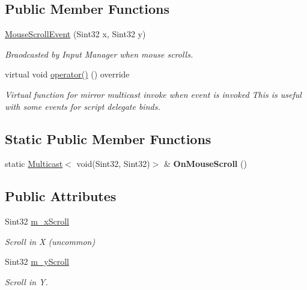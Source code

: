 \subsection*{Public Member Functions}
\begin{DoxyCompactItemize}
\item 
\hyperlink{classMouseScrollEvent_a3938241efa68cba150c7c9957b447258}{Mouse\+Scroll\+Event} (Sint32 x, Sint32 y)
\begin{DoxyCompactList}\small\item\em Braodcasted by Input Manager when mouse scrolls. \end{DoxyCompactList}\item 
\mbox{\label{classMouseScrollEvent_a4b4ffccb70bf75327aa323f6c1fd7d20}} 
virtual void \hyperlink{classMouseScrollEvent_a4b4ffccb70bf75327aa323f6c1fd7d20}{operator()} () override
\begin{DoxyCompactList}\small\item\em Virtual function for mirror multicast invoke when event is invoked This is useful with some events for script delegate binds. \end{DoxyCompactList}\end{DoxyCompactItemize}
\subsection*{Static Public Member Functions}
\begin{DoxyCompactItemize}
\item 
\mbox{\label{classMouseScrollEvent_a2b7093d767331a10993035c929d35761}} 
static \hyperlink{classMulticast}{Multicast}$<$ void(Sint32, Sint32)$>$ \& {\bfseries On\+Mouse\+Scroll} ()
\end{DoxyCompactItemize}
\subsection*{Public Attributes}
\begin{DoxyCompactItemize}
\item 
\mbox{\label{classMouseScrollEvent_aefeed12e14c36c817d9e2c6eed748160}} 
Sint32 \hyperlink{classMouseScrollEvent_aefeed12e14c36c817d9e2c6eed748160}{m\+\_\+x\+Scroll}
\begin{DoxyCompactList}\small\item\em Scroll in X (uncommon) \end{DoxyCompactList}\item 
\mbox{\label{classMouseScrollEvent_a3483f8222e45682511ec158f4d61ee01}} 
Sint32 \hyperlink{classMouseScrollEvent_a3483f8222e45682511ec158f4d61ee01}{m\+\_\+y\+Scroll}
\begin{DoxyCompactList}\small\item\em Scroll in Y. \end{DoxyCompactList}\end{DoxyCompactItemize}
